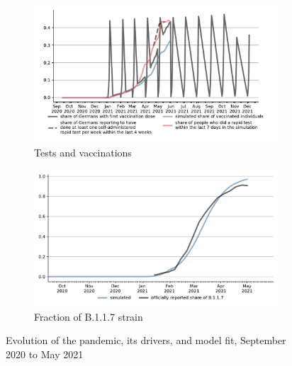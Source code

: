 \begin{figure}[!tp]
\begin{subfigure}[b]{0.475\textwidth}
        \includegraphics[width=\textwidth]{../figures/results/figures/scenario_comparisons/combined_fit/full_share_rapid_test_in_last_week_and_vaccinated}

        \caption{{Tests and vaccinations}}
        \label{fig:antigen_tests_vaccinations}
    \end{subfigure}
    \hfill
    \begin{subfigure}[b]{0.475\textwidth}
        \centering

        \includegraphics[width=\textwidth]{../figures/results/figures/scenario_comparisons/combined_fit/full_share_b117}

        \caption{Fraction of B.1.1.7 strain}
        \label{fig:share_b117}
    \end{subfigure}

    \caption{Evolution of the pandemic, its drivers, and model fit, September 2020 to May 2021}
    \label{fig:pandemic_drivers_model_fit}


\end{figure}
